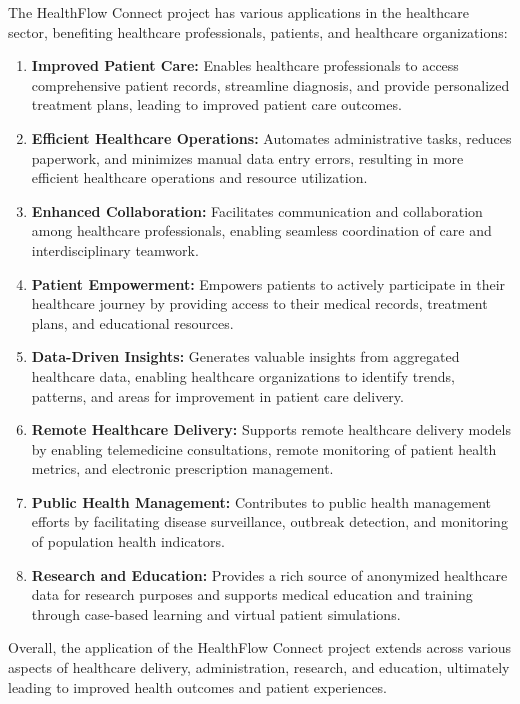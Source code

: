 The HealthFlow Connect project has various applications in the healthcare sector, benefiting healthcare professionals, patients, and healthcare organizations:

\begin{enumerate}[label=\textbf{\arabic*.}]
  \item \textbf{Improved Patient Care:} Enables healthcare professionals to access comprehensive patient records, streamline diagnosis, and provide personalized treatment plans, leading to improved patient care outcomes.
  
  \item \textbf{Efficient Healthcare Operations:} Automates administrative tasks, reduces paperwork, and minimizes manual data entry errors, resulting in more efficient healthcare operations and resource utilization.
  
  \item \textbf{Enhanced Collaboration:} Facilitates communication and collaboration among healthcare professionals, enabling seamless coordination of care and interdisciplinary teamwork.
  
  \item \textbf{Patient Empowerment:} Empowers patients to actively participate in their healthcare journey by providing access to their medical records, treatment plans, and educational resources.
  
  \item \textbf{Data-Driven Insights:} Generates valuable insights from aggregated healthcare data, enabling healthcare organizations to identify trends, patterns, and areas for improvement in patient care delivery.
  
  \item \textbf{Remote Healthcare Delivery:} Supports remote healthcare delivery models by enabling telemedicine consultations, remote monitoring of patient health metrics, and electronic prescription management.
  
  \item \textbf{Public Health Management:} Contributes to public health management efforts by facilitating disease surveillance, outbreak detection, and monitoring of population health indicators.
  
  \item \textbf{Research and Education:} Provides a rich source of anonymized healthcare data for research purposes and supports medical education and training through case-based learning and virtual patient simulations.
\end{enumerate}

Overall, the application of the HealthFlow Connect project extends across various aspects of healthcare delivery, administration, research, and education, ultimately leading to improved health outcomes and patient experiences.
